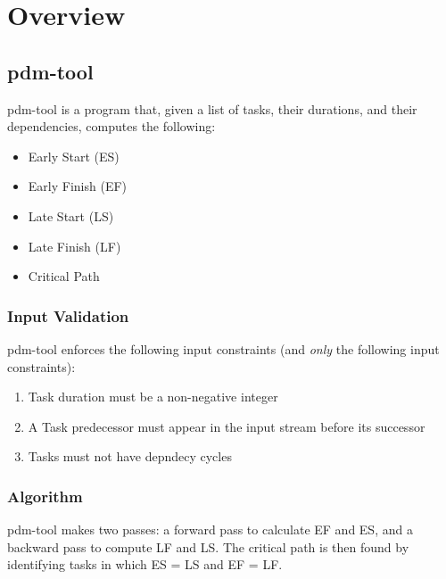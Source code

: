 \chapter{Overview}

\section{pdm-tool}

pdm-tool is a program that, given a list of tasks, their durations, and
their dependencies, computes the following:

\begin{itemize}
    \item Early Start (ES)
    \item Early Finish (EF)
    \item Late Start (LS)
    \item Late Finish (LF)
    \item Critical Path
\end{itemize}

\subsection{Input Validation}

pdm-tool enforces the following input constraints (and \textit{only} the
following input constraints):

\begin{enumerate}
    \item Task duration must be a non-negative integer
    \item A Task predecessor must appear in the input stream before its
          successor
    \item Tasks must not have depndecy cycles
\end{enumerate}

\subsection{Algorithm}

pdm-tool makes two passes: a forward pass to calculate EF and ES, and a
backward pass to compute LF and LS. The critical path is then found by
identifying tasks in which ES = LS and EF = LF.
